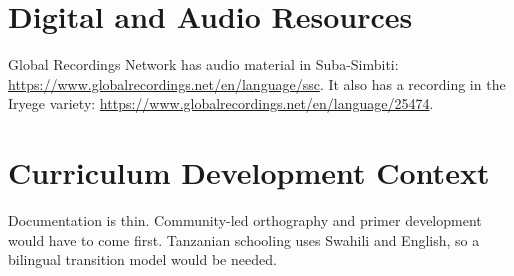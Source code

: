 \documentclass[12pt]{article}
\begin{document}
\section{Digital and Audio Resources}
Global Recordings Network has audio material in Suba-Simbiti: \url{https://www.globalrecordings.net/en/language/ssc}. It also has a recording in the Iryege variety: \url{https://www.globalrecordings.net/en/language/25474}.

\section{Curriculum Development Context}
Documentation is thin. Community-led orthography and primer development would have to come first. Tanzanian schooling uses Swahili and English, so a bilingual transition model would be needed.
\end{document}
